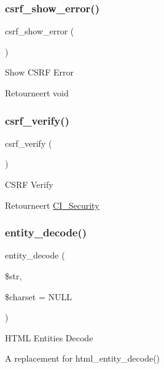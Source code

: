 \subsubsection{\texorpdfstring{csrf\_show\_error()}{csrf\_show\_error()}}
{\footnotesize\ttfamily csrf\+\_\+show\+\_\+error (\begin{DoxyParamCaption}{ }\end{DoxyParamCaption})}

Show C\+S\+RF Error

\begin{DoxyReturn}{Retourneert}
void 
\end{DoxyReturn}
\mbox{\label{class_c_i___security_a03c037268db0c2e6221b65a736eaee07}} 
\subsubsection{\texorpdfstring{csrf\_verify()}{csrf\_verify()}}
{\footnotesize\ttfamily csrf\+\_\+verify (\begin{DoxyParamCaption}{ }\end{DoxyParamCaption})}

C\+S\+RF Verify

\begin{DoxyReturn}{Retourneert}
\mbox{\hyperlink{class_c_i___security}{C\+I\+\_\+\+Security}} 
\end{DoxyReturn}
\mbox{\label{class_c_i___security_a8bec9918f4d35c9e6340e1dc6a32ba14}} 
\subsubsection{\texorpdfstring{entity\_decode()}{entity\_decode()}}
{\footnotesize\ttfamily entity\+\_\+decode (\begin{DoxyParamCaption}\item[{}]{\$str,  }\item[{}]{\$charset = {\ttfamily NULL} }\end{DoxyParamCaption})}

H\+T\+ML Entities Decode

A replacement for html\+\_\+entity\+\_\+decode()


